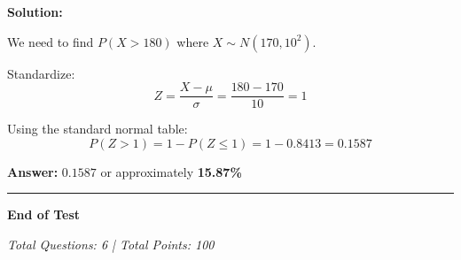 \documentclass[12pt]{article}
\begin{document}
\textbf{Solution:}

We need to find $P(X > 180)$ where $X \sim N(170, 10^2)$.

Standardize:
$$Z = \frac{X - \mu}{\sigma} = \frac{180 - 170}{10} = 1$$

Using the standard normal table:
$$P(Z > 1) = 1 - P(Z \leq 1) = 1 - 0.8413 = 0.1587$$

\textbf{Answer:} $\boxed{0.1587}$ or approximately \textbf{15.87\%}

\vspace{2em}

\begin{center}
\rule{\textwidth}{0.4pt}

\textbf{End of Test}

\textit{Total Questions: 6 | Total Points: 100}
\end{center}
\end{document}
